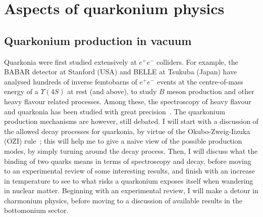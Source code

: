 \chapter{Aspects of quarkonium physics}
\label{chap:pquarkonia}

\minitoc



\section{Quarkonium production in vacuum}
\label{sec:production}
Quarkonia were first studied extensively at
$e^{+}e^{-}$ colliders. For example, the BABAR detector at Stanford (USA)
and BELLE at Tsukuba (Japan) have analysed hundreds of inverse
femtobarns of $e^{+}e^{-}$ events at the centre-of-mass energy of
a $\Upsilon(4S)$ at rest (and above), to study $B$ meson production and other
heavy flavour related processes. Among these, the spectroscopy of
heavy flavour and quarkonia has been studied with great
precision~\cite{nora}.
The quarkonium production mechanisms are however, still debated.
 I will start with a
discussion of the allowed decay processes for quarkonia, by virtue of
the Okubo-Zweig-Iizuka (OZI) rule~\cite{Okubo:1963fa,Iizuka:1966fk,Zweig:570209}; this will
help me to give a naive view of the possible production modes, by
simply turning around the decay process. Then, I will discuss what
the binding of two quarks means in terms of
spectroscopy and decay, before moving to an experimental review of
some interesting results, and finish with an increase in temperature to
see to what risks a quarkonium exposes itself when wandering in nuclear
matter. Beginning with an experimental review, I will make a detour in
charmonium physics, before moving to a discussion of available results in
the bottomonium sector.


